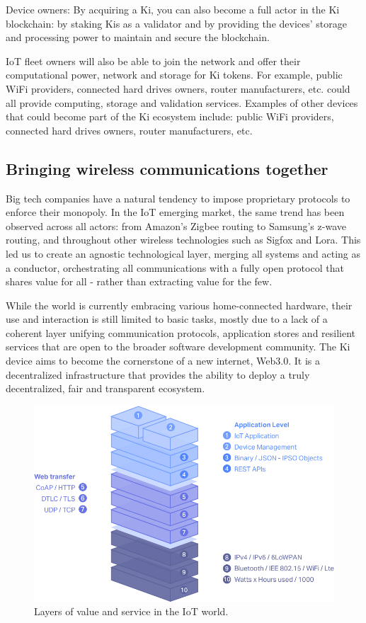 Device owners: By acquiring a Ki, you can also become a full actor in the Ki blockchain: by staking Kis as a validator and by providing the devices' storage and processing power to maintain and secure the blockchain. 

IoT fleet owners will also be able to join the network and offer their computational power, network and storage for Ki tokens. For example, public WiFi providers, connected hard drives owners, router manufacturers, etc. could all provide computing, storage and validation services. Examples of other devices that could become part of the Ki ecosystem include: public WiFi providers, connected hard drives owners, router manufacturers, etc.					


\subsection{Bringing wireless communications together}
\label{sec:kiecosystemwireless}
Big tech companies have a natural tendency to impose proprietary protocols to enforce their monopoly. In the IoT emerging market, the same trend has been observed across all actors: from Amazon's Zigbee routing to Samsung's z-wave routing, and throughout other wireless technologies such as Sigfox and Lora. This led us to create an agnostic technological layer, merging all systems and acting as a conductor, orchestrating all communications with a fully open protocol that shares value for all - rather than extracting value for the few.
					
While the world is currently embracing various home-connected hardware, their use and interaction is still limited to basic tasks, mostly due to a lack of a coherent layer unifying communication protocols, application stores and resilient services that are open to the broader software development community. The Ki device aims to become the cornerstone of a new internet, Web3.0. It is a decentralized infrastructure that provides the ability to deploy a truly decentralized, fair and transparent ecosystem.

\begin{figure}[!ht]
	\includegraphics[width=\linewidth, trim= 0cm 0cm 0cm 0cm, clip]{Figures/iot.png}
	\caption{Layers of value and service in the IoT world.}
	\label{fig:iot}
\end{figure}

